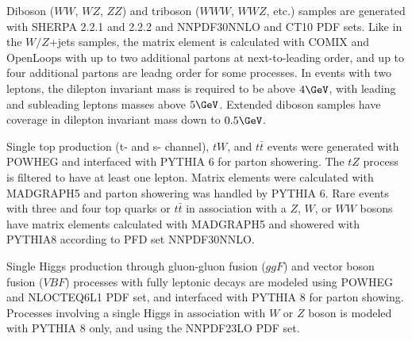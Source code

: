 Diboson ($WW$, $WZ$, $ZZ$) and triboson ($WWW$, $WWZ$, etc.) samples are generated with SHERPA 2.2.1 and 2.2.2 and NNPDF30NNLO and CT10 PDF sets.  Like in the $W/Z$+jets samples, the matrix element is calculated with COMIX and OpenLoops with up to two additional partons at next-to-leading order, and up to four additional partons are leadng order for some processes.  In events with two leptons, the dilepton invariant mass is required to be above $4\GeV$, with leading and subleading leptons masses above $5\GeV$.  Extended diboson samples have coverage in dilepton invariant mass down to $0.5\GeV$.    
 
 Single top production (t- and s- channel), $tW$, and $t\bar{t}$ events were generated with POWHEG and interfaced with PYTHIA 6 for parton showering.  The $tZ$ process is filtered to have at least one lepton.  Matrix elements were calculated with MADGRAPH5 and parton showering was handled by PYTHIA 6.  Rare events with three and four top quarks or $t\bar{t}$ in association with a $Z$, $W$, or $WW$ bosons have matrix elements calculated with MADGRAPH5 and showered with PYTHIA8 according to PFD set NNPDF30NNLO.
 
Single Higgs production through gluon-gluon fusion ($ggF$) and vector boson fusion ($VBF$) processes with fully leptonic decays are modeled using POWHEG and NLOCTEQ6L1 PDF set, and interfaced with PYTHIA 8 for parton showing.  Processes involving a single Higgs in association with $W$ or $Z$ boson is modeled with PYTHIA 8 only, and using the NNPDF23LO PDF set.
 
 \iffalse
 \section{Derivation}
Describe details of the SUSY16 derivation used to select events from data

\fi 

 

